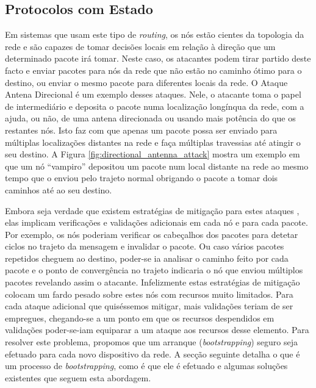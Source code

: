 \documentclass{llncs}
\begin{document}
\subsection{Protocolos com Estado}
\label{sec:tables_routing}
Em sistemas que usam este tipo de \textit{routing}, os nós estão cientes da topologia da rede e são capazes de tomar decisões locais em relação à direção que um determinado pacote irá tomar. 
Neste caso, os atacantes podem tirar partido deste facto e enviar pacotes para nós da rede que não estão no caminho ótimo para o destino, ou enviar o mesmo pacote para diferentes locais da rede. 
O Ataque Antena Direcional é um exemplo desses ataques. 
Nele, o atacante toma o papel de intermediário e deposita o pacote numa localização longínqua da rede, com a ajuda, ou não, de uma antena direcionada ou 
usando mais potência do que os restantes nós. 
Isto faz com que apenas um pacote possa ser enviado para múltiplas localizações distantes na rede e faça múltiplas travessias até atingir o seu destino. 
A Figura \ref{fig:directional_antenna_attack} mostra um exemplo em que um nó ``vampiro'' depositou um pacote num local distante na rede ao mesmo tempo que o enviou pelo trajeto normal obrigando o pacote a tomar dois caminhos até ao seu destino.

Embora seja verdade que existem estratégias de mitigação para estes ataques \cite{Vasserman2013}, elas implicam verificações e validações adicionais em cada nó e para cada pacote. 
Por exemplo, os nós poderiam verificar os cabeçalhos dos pacotes para detetar ciclos no trajeto da mensagem e invalidar o pacote. 
Ou caso vários pacotes repetidos cheguem ao destino, poder-se ia analisar o caminho feito por cada pacote e o ponto de convergência no trajeto indicaria o nó que enviou múltiplos pacotes revelando assim o atacante. 
Infelizmente estas estratégias de mitigação colocam um fardo pesado sobre estes nós com recursos muito limitados. 
Para cada ataque adicional que quiséssemos mitigar, mais validações teriam de ser empregues, chegando-se a um ponto em que os recursos despendidos em validações poder-se-iam equiparar a um ataque aos recursos desse elemento. 
Para resolver este problema, propomos que um arranque (\textit{bootstrapping}) seguro seja efetuado para cada novo dispositivo da rede. 
A secção seguinte detalha o que é um processo de \textit{bootstrapping}, como é que ele é efetuado e algumas soluções existentes que seguem esta abordagem.
\end{document}
